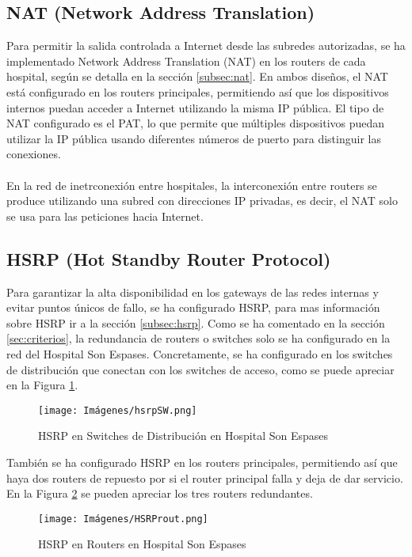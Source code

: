 \subsection{NAT (Network Address Translation)}
Para permitir la salida controlada a Internet desde las subredes autorizadas, se ha implementado Network Address Translation (NAT) en los routers de cada hospital, 
según se detalla en la sección \ref{subsec:nat}. En ambos diseños, el NAT está configurado en los routers principales, permitiendo así que los dispositivos internos puedan acceder a Internet utilizando la misma IP pública. El tipo de 
NAT configurado es el PAT, lo que permite que múltiples dispositivos puedan utilizar la IP pública usando diferentes números de puerto para distinguir las conexiones.
\\ \\
En la red de inetrconexión entre hospitales, la interconexión entre routers se produce utilizando una subred con direcciones IP privadas, es decir, el NAT solo se usa para las peticiones hacia Internet.
\subsection{HSRP (Hot Standby Router Protocol)}
Para garantizar la alta disponibilidad en los gateways de las redes internas y evitar puntos únicos de fallo, se ha configurado HSRP, para mas información sobre HSRP ir a la sección \ref{subsec:hsrp}. 
Como se ha comentado en la sección \ref{sec:criterios}, la redundancia de routers o switches solo se ha configurado en la red del Hospital Son Espases. Concretamente, se ha configurado en los switches de distribución 
que conectan con los switches de acceso, como se puede apreciar en la Figura \ref{fig:HSRPSW}.

\begin{figure}[H]
    \centering
    \texttt{[image: Imágenes/hsrpSW.png]}
    \caption{HSRP en Switches de Distribución en Hospital Son Espases}
    \label{fig:HSRPSW}
\end{figure}

También se ha configurado HSRP en los routers principales, permitiendo así que haya dos routers de repuesto por si el router principal falla y deja de dar servicio. En la Figura \ref{fig:HSRPRou} 
se pueden apreciar los tres routers redundantes.

\begin{figure}[H]
    \centering
    \texttt{[image: Imágenes/HSRProut.png]}
    \caption{HSRP en Routers en Hospital Son Espases}
    \label{fig:HSRPRou}
\end{figure}

